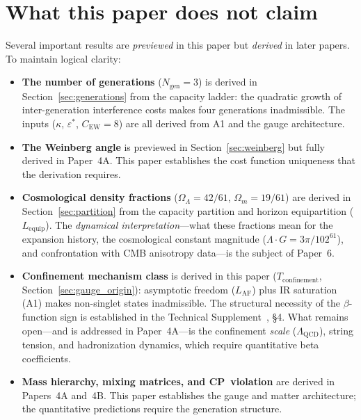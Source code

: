\documentclass[11pt]{article}
\newenvironment{varlist}{\begin{itemize}[nosep,leftmargin=2em]}{\end{itemize}}
\begin{document}
\section{What this paper does not claim}
\label{sec:caveats}

Several important results are \emph{previewed} in this paper but \emph{derived} in later papers.  To maintain logical clarity:

\begin{varlist}
\item \textbf{The number of generations} ($N_{\mathrm{gen}} = 3$) is derived in Section~\ref{sec:generations} from the capacity ladder: the quadratic growth of inter-generation interference costs makes four generations inadmissible.  The inputs ($\kappa$, $\varepsilon^*$, $C_{\mathrm{EW}} = 8$) are all derived from A1 and the gauge architecture.
\item \textbf{The Weinberg angle} is previewed in Section~\ref{sec:weinberg} but fully derived in Paper~4A.  This paper establishes the cost function uniqueness that the derivation requires.
\item \textbf{Cosmological density fractions} ($\Omega_\Lambda = 42/61$, $\Omega_m = 19/61$) are derived in Section~\ref{sec:partition} from the capacity partition and horizon equipartition ($L_{\mathrm{equip}}$).  The \emph{dynamical interpretation}---what these fractions mean for the expansion history, the cosmological constant magnitude ($\Lambda \cdot G = 3\pi/102^{61}$), and confrontation with CMB anisotropy data---is the subject of Paper~6.
\item \textbf{Confinement mechanism class} is derived in this paper ($T_{\mathrm{confinement}}$, Section~\ref{sec:gauge_origin}): asymptotic freedom ($L_{\mathrm{AF}}$) plus IR saturation (A1) makes non-singlet states inadmissible.  The structural necessity of the $\beta$-function sign is established in the Technical Supplement~\cite{BrookeP2Supplement}, \S4.  What remains open---and is addressed in Paper~4A---is the confinement \emph{scale} ($\Lambda_{\mathrm{QCD}}$), string tension, and hadronization dynamics, which require quantitative beta coefficients.
\item \textbf{Mass hierarchy, mixing matrices, and CP~violation} are derived in Papers~4A and~4B.  This paper establishes the gauge and matter architecture; the quantitative predictions require the generation structure.

\end{varlist}
\end{document}
